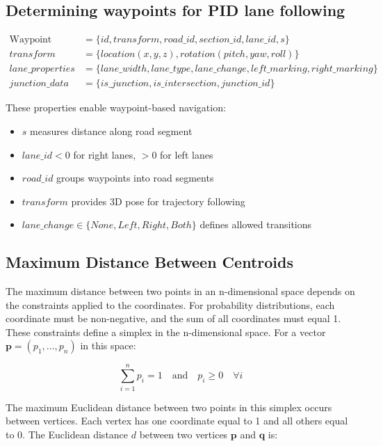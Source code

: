\subsection{Determining waypoints for PID lane following}

\begin{align*}
\text{Waypoint} &= \{id, transform, road\_id, section\_id, lane\_id, s\} \\
transform &= \{location(x,y,z), rotation(pitch,yaw,roll)\} \\
lane\_properties &= \{lane\_width, lane\_type, lane\_change, left\_marking, right\_marking\} \\
junction\_data &= \{is\_junction, is\_intersection, junction\_id\}
\end{align*}

These properties enable waypoint-based navigation:
\begin{itemize}
\item $s$ measures distance along road segment
\item $lane\_id < 0$ for right lanes, $> 0$ for left lanes
\item $road\_id$ groups waypoints into road segments
\item $transform$ provides 3D pose for trajectory following
\item $lane\_change \in \{None, Left, Right, Both\}$ defines allowed transitions
\end{itemize}

\subsection{Maximum Distance Between Centroids}

The maximum distance between two points in an n-dimensional space depends on the constraints applied to the coordinates. For probability distributions, each coordinate must be non-negative, and the sum of all coordinates must equal 1. These constraints define a simplex in the n-dimensional space. For a vector $\mathbf{p} = (p_1, ..., p_n)$ in this space:

\begin{equation}
\sum_{i=1}^n p_i = 1 \quad \text{and} \quad p_i \geq 0 \quad \forall i
\end{equation}

The maximum Euclidean distance between two points in this simplex occurs between vertices. Each vertex has one coordinate equal to 1 and all others equal to 0. The Euclidean distance $d$ between two vertices $\mathbf{p}$ and $\mathbf{q}$ is:

